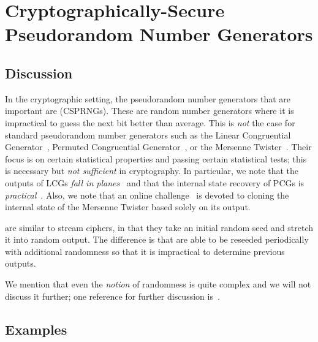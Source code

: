 \section{Cryptographically-Secure Pseudorandom Number Generators}
\label{sec:csprng}

\subsection{Discussion}

In the cryptographic setting, the pseudorandom number generators
that are important are
\emph{}
(CSPRNGs).
These are random number generators where it is impractical
to guess the next bit better than average.
This is \emph{not} the case for standard pseudorandom number generators
such as the Linear Congruential Generator~\cite[Chapter 3.2.1]{TAOCP2},
Permuted Congruential Generator~\cite{PCG2014},
or the Mersenne Twister~\cite{matsumoto1998mersenne}.
Their focus is on certain statistical properties and passing
certain statistical tests;
this is necessary but \emph{not sufficient} in cryptography.
In particular, we note that the outputs of LCGs
\emph{fall in planes}~\cite{marsaglia1968random}
and that the internal state recovery of PCGs
is \emph{practical}~\cite{bouillaguet2020practical}.
Also, we note that an online challenge~\cite{CryptoPals23}
is devoted to cloning the internal state of the Mersenne Twister
based solely on its output.

 are similar to \glspl{stream cipher}, in that they take
an initial random seed and stretch it into random output.
The difference is that  are able to be reseeded
periodically with additional randomness
so that it is impractical to determine previous outputs.

We mention that even the \emph{notion} of randomness is quite complex
and we will not discuss it further;
one reference for further discussion is~\cite[Chapter 3.5]{TAOCP2}.

\subsection{Examples}

